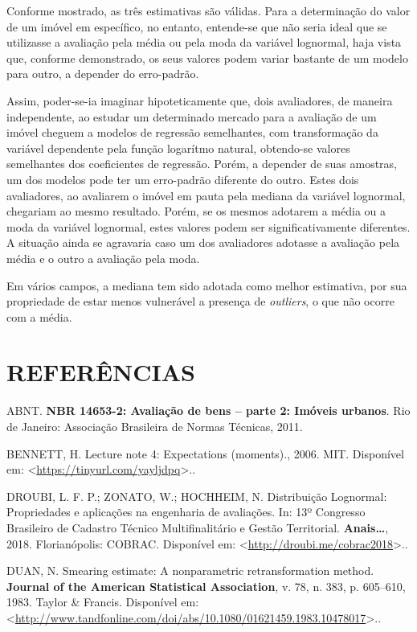 \documentclass[a4paper, 12pt]{article}
\begin{document}
Conforme mostrado, as três estimativas são válidas. Para a determinação
do valor de um imóvel em específico, no entanto, entende-se que não
seria ideal que se utilizasse a avaliação pela média ou pela moda da
variável lognormal, haja vista que, conforme demonstrado, os seus
valores podem variar bastante de um modelo para outro, a depender do
erro-padrão.

Assim, poder-se-ia imaginar hipoteticamente que, dois avaliadores, de
maneira independente, ao estudar um determinado mercado para a avaliação
de um imóvel cheguem a modelos de regressão semelhantes, com
transformação da variável dependente pela função logarítmo natural,
obtendo-se valores semelhantes dos coeficientes de regressão. Porém, a
depender de suas amostras, um dos modelos pode ter um erro-padrão
diferente do outro. Estes dois avaliadores, ao avaliarem o imóvel em
pauta pela mediana da variável lognormal, chegariam ao mesmo resultado.
Porém, se os mesmos adotarem a média ou a moda da variável lognormal,
estes valores podem ser significativamente diferentes. A situação ainda
se agravaria caso um dos avaliadores adotasse a avaliação pela média e o
outro a avaliação pela moda.

Em vários campos, a mediana tem sido adotada como melhor estimativa, por
sua propriedade de estar menos vulnerável a presença de \emph{outliers},
o que não ocorre com a média.

\section*{REFERÊNCIAS}\label{referencias}

\hypertarget{refs}{}
\hypertarget{ref-NBR1465302}{}
ABNT. \textbf{NBR 14653-2: Avaliação de bens -- parte 2: Imóveis
urbanos}. Rio de Janeiro: Associação Brasileira de Normas Técnicas,
2011.

\hypertarget{ref-bennett}{}
BENNETT, H. Lecture note 4: Expectations (moments)., 2006. MIT.
Disponível em:
\textless{}\url{https://tinyurl.com/yayljdpq}\textgreater{}..

\hypertarget{ref-dist_lognormal}{}
DROUBI, L. F. P.; ZONATO, W.; HOCHHEIM, N. Distribuição Lognormal:
Propriedades e aplicações na engenharia de avaliações. In: 13º Congresso
Brasileiro de Cadastro Técnico Multifinalitário e Gestão Territorial.
\textbf{Anais\ldots{}}, 2018. Florianópolis: COBRAC. Disponível em:
\textless{}\url{http://droubi.me/cobrac2018}\textgreater{}..

\hypertarget{ref-Duan}{}
DUAN, N. Smearing estimate: A nonparametric retransformation method.
\textbf{Journal of the American Statistical Association}, v. 78, n. 383,
p. 605--610, 1983. Taylor \& Francis. Disponível em:
\textless{}\url{http://www.tandfonline.com/doi/abs/10.1080/01621459.1983.10478017}\textgreater{}..
\end{document}
